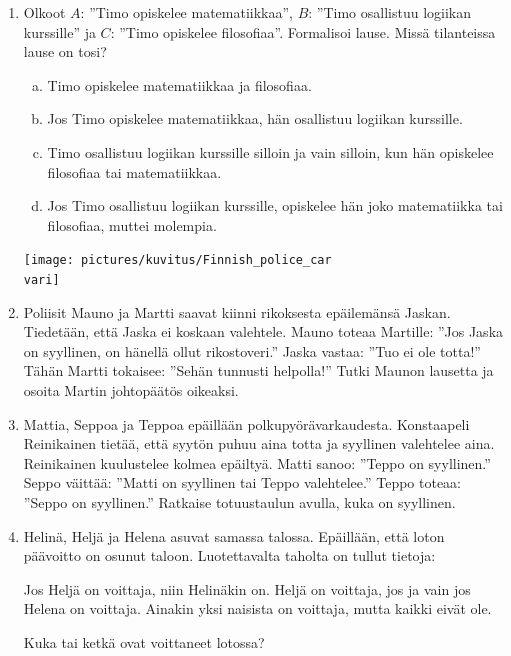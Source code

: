 \begin{enumerate}
\item
Olkoot $A$: ''Timo opiskelee matematiikkaa'', $B$: ''Timo osallistuu logiikan kurssille'' ja $C$: ''Timo opiskelee filosofiaa''. Formalisoi lause. Missä tilanteissa lause on tosi?
\begin{enumerate}[a)]
\item Timo opiskelee matematiikkaa ja filosofiaa.
\item Jos Timo opiskelee matematiikkaa, hän osallistuu logiikan kurssille.
\item Timo osallistuu logiikan kurssille silloin ja vain silloin, kun hän opiskelee filosofiaa tai matematiikkaa.
\item Jos Timo osallistuu logiikan kurssille, opiskelee hän joko matematiikka tai filosofiaa, muttei molempia.
\end{enumerate}

\bigskip

\begin{center}
\texttt{[image: pictures/kuvitus/Finnish\_police\_car\\vari]}
\end{center}

\item Poliisit Mauno ja Martti saavat kiinni rikoksesta epäilemänsä Jaskan. Tiedetään, että Jaska ei koskaan valehtele. Mauno toteaa Martille: ''Jos Jaska on syyllinen, on hänellä ollut rikostoveri.'' Jaska vastaa: ''Tuo ei ole totta!'' Tähän Martti tokaisee: ''Sehän tunnusti helpolla!'' Tutki Maunon lausetta ja osoita Martin johtopäätös oikeaksi.

\item Mattia, Seppoa ja Teppoa epäillään polkupyörävarkaudesta. Konstaapeli Reinikainen tietää, että syytön puhuu aina totta ja syyllinen valehtelee aina. Reinikainen kuulustelee kolmea epäiltyä. Matti sanoo: ''Teppo on syyllinen.'' Seppo väittää: ''Matti on syyllinen tai Teppo valehtelee.'' Teppo toteaa: ''Seppo on syyllinen.'' Ratkaise totuustaulun avulla, kuka on syyllinen. 

\newpage

\item Helinä, Heljä ja Helena asuvat samassa talossa. Epäillään, että loton päävoitto on osunut taloon. Luotettavalta taholta on tullut tietoja:

Jos Heljä on voittaja, niin Helinäkin on. 
Heljä on voittaja, jos ja vain jos Helena on voittaja.
Ainakin yksi naisista on voittaja, mutta kaikki eivät ole.

Kuka tai ketkä ovat voittaneet lotossa?


\end{enumerate}
